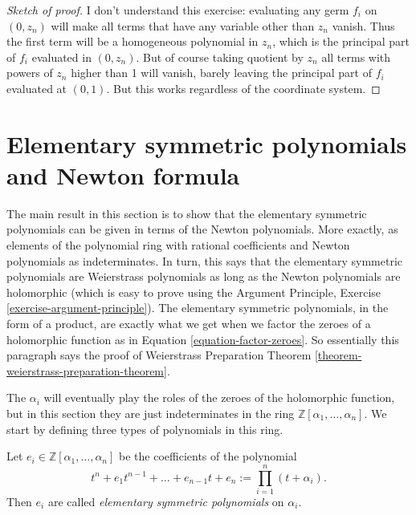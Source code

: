 \begin{proof}[Sketch of proof]
I don't understand this exercise: evaluating any germ $f_i$ on $(0,z_n)$ will
make all terms that have any variable other than $z_n$ vanish. Thus the first
term will be a homogeneous polynomial in $z_n$, which is the principal part of
$f_i$ evaluated in $(0,z_n)$. But of course taking quotient by $z_n$ all terms
with powers of $z_n$ higher than 1 will vanish, barely leaving the principal
part of $f_i$ evaluated at $(0,1)$. But this works regardless of the coordinate
system.
\end{proof}

\section{Elementary symmetric polynomials and Newton formula}
\label{section-elementary-symmetric-polynomials-and-newton-formula}

\noindent
The main result in this section
is to show that the elementary symmetric polynomials
can be given in terms of the Newton polynomials.
More exactly, as elements of the polynomial
ring with rational coefficients and Newton polynomials
as indeterminates.
In turn, this says that the elementary symmetric polynomials
are Weierstrass polynomials as long as the Newton polynomials
are holomorphic (which is easy to prove using the Argument Principle,
Exercise \ref{exercise-argument-principle}).
The elementary symmetric polynomials, in the form of a product,
are exactly what we get when we factor the zeroes
of a holomorphic function as in Equation \ref{equation-factor-zeroes}.
So essentially this paragraph says the proof of 
Weierstrass Preparation Theorem \ref{theorem-weierstrass-preparation-theorem}.

\medskip\noindent
The $\alpha_i$ will eventually play the roles of the zeroes
of the holomorphic function, but in this section they are just
indeterminates in the ring $\mathbb{Z}[\alpha_1,\ldots,\alpha_n]$.
We start by defining three types of polynomials in this ring.

\begin{definition}
\label{definition-symmetric-polynomial}
Let $e_i \in \mathbb{Z}[\alpha_1,\ldots,\alpha_n]$ be the coefficients of the
polynomial 
\begin{equation}
\label{equation-elementary-symmetric-polynomial}
t^n+e_1t^{n-1}+\ldots+e_{n-1}t+e_n:=\prod_{i=1}^n(t+\alpha_i).
\end{equation}
Then $e_i$ are called {\it elementary
symmetric polynomials} on $\alpha_i$.
\end{definition}


